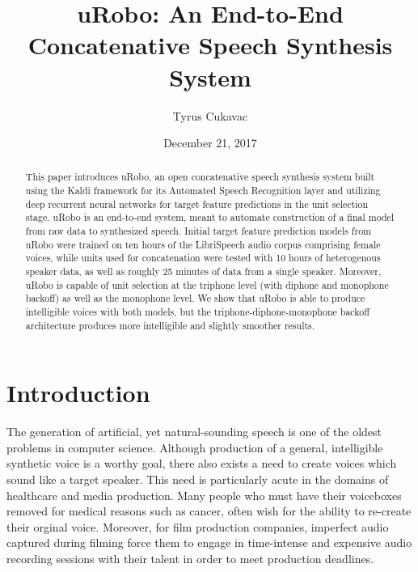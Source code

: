 \documentclass[10pt,a4paper,twocolumn]{article}
\author{Tyrus Cukavac}
\title{uRobo: An End-to-End Concatenative Speech Synthesis System}
\date{December 21, 2017}
\begin{document}
\maketitle
\begin{abstract}
This paper introduces uRobo, an open concatenative speech synthesis system built using the Kaldi framework for its Automated Speech Recognition layer and utilizing deep recurrent neural networks for target feature predictions in the unit selection stage. uRobo is an end-to-end system, meant to automate construction of a final model from raw data to synthesized speech. Initial target feature prediction models from uRobo were trained on ten hours of the LibriSpeech audio corpus comprising female voices, while units used for concatenation were tested with 10 hours of heterogenous speaker data, as well as roughly 25 minutes of data from a single speaker. Moreover, uRobo is capable of unit selection at the triphone level (with diphone and monophone backoff) as well as the monophone level. We show that uRobo is able to produce intelligible voices with both models, but the triphone-diphone-monophone backoff architecture produces more intelligible and slightly smoother results.
\end{abstract}
\section{Introduction}
The generation of artificial, yet natural-sounding speech is one of the oldest problems in computer science. Although production of a general, intelligible synthetic voice is a worthy goal, there also exists a need to create voices which sound like a target speaker. This need is particularly acute in the domains of healthcare and media production. Many people who must have their voiceboxes removed for medical reasons such as cancer, often wish for the ability to re-create their orginal voice. Moreover, for film production companies, imperfect audio captured during filming force them to engage in time-intense and expensive audio recording sessions with their talent in order to meet production deadlines.\par
\end{document}
